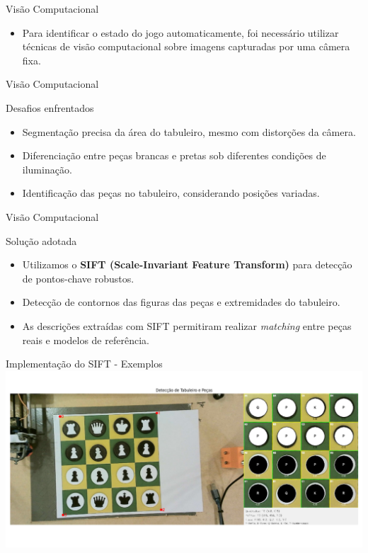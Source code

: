 \documentclass{beamer}
\begin{document}
\begin{frame}{Visão Computacional}
\begin{itemize}
    \item Para identificar o estado do jogo automaticamente, foi necessário utilizar técnicas de visão computacional sobre imagens capturadas por uma câmera fixa.
\end{itemize}
\end{frame}

\begin{frame}{Visão Computacional}
      \begin{alertblock}{Desafios enfrentados}
          \begin{itemize}
        \item Segmentação precisa da área do tabuleiro, mesmo com distorções da câmera.
        \item Diferenciação entre peças brancas e pretas sob diferentes condições de iluminação.
        \item Identificação das peças no tabuleiro, considerando posições variadas.
    \end{itemize}    
  \end{alertblock}
\end{frame}

\begin{frame}{Visão Computacional}
  \begin{exampleblock}{Solução adotada}
        \begin{itemize}
        \item Utilizamos o \textbf{SIFT (Scale-Invariant Feature Transform)} para detecção de pontos-chave robustos.
        \item Detecção de contornos das figuras das peças e extremidades do tabuleiro.
        \item As descrições extraídas com SIFT permitiram realizar \textit{matching} entre peças reais e modelos de referência.
    \end{itemize}
  \end{exampleblock}

\end{frame}

\begin{frame}[plain]{Implementação do SIFT - Exemplos}
  \centering
\includegraphics[width=0.95\paperwidth,keepaspectratio]{images/exemplo4_cv.png}
\end{frame}
\end{document}
